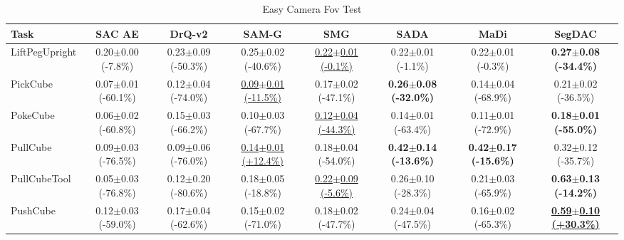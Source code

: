 
\begin{table}[htbp]
\centering
\scriptsize
\caption{Easy Camera Fov Test}
\label{tab:appendix_camerafovtest_easy}
\begin{adjustbox}{max width=\textwidth}
\begin{tabular}{l*{7}{c}}
\toprule
\textbf{Task} & \textbf{SAC AE} & \textbf{DrQ-v2} & \textbf{SAM-G} & \textbf{SMG} & \textbf{SADA} & \textbf{MaDi} & \textbf{SegDAC} \\
\midrule
LiftPegUpright & 0.20$\pm$0.00 \scriptsize{(-7.8\%)} & 0.23$\pm$0.09 \scriptsize{(-50.3\%)} & 0.25$\pm$0.02 \scriptsize{(-40.6\%)} & \underline{0.22$\pm$0.01 \scriptsize{(-0.1\%)}} & 0.22$\pm$0.01 \scriptsize{(-1.1\%)} & 0.22$\pm$0.01 \scriptsize{(-0.3\%)} & \textbf{0.27$\pm$0.08 \scriptsize{(-34.4\%)}} \\
PickCube & 0.07$\pm$0.01 \scriptsize{(-60.1\%)} & 0.12$\pm$0.04 \scriptsize{(-74.0\%)} & \underline{0.09$\pm$0.01 \scriptsize{(-11.5\%)}} & 0.17$\pm$0.02 \scriptsize{(-47.1\%)} & \textbf{0.26$\pm$0.08 \scriptsize{(-32.0\%)}} & 0.14$\pm$0.04 \scriptsize{(-68.9\%)} & 0.21$\pm$0.02 \scriptsize{(-36.5\%)} \\
PokeCube & 0.06$\pm$0.02 \scriptsize{(-60.8\%)} & 0.15$\pm$0.03 \scriptsize{(-66.2\%)} & 0.10$\pm$0.03 \scriptsize{(-67.7\%)} & \underline{0.12$\pm$0.04 \scriptsize{(-44.3\%)}} & 0.14$\pm$0.01 \scriptsize{(-63.4\%)} & 0.11$\pm$0.01 \scriptsize{(-72.9\%)} & \textbf{0.18$\pm$0.01 \scriptsize{(-55.0\%)}} \\
PullCube & 0.09$\pm$0.03 \scriptsize{(-76.5\%)} & 0.09$\pm$0.06 \scriptsize{(-76.0\%)} & \underline{0.14$\pm$0.01 \scriptsize{(+12.4\%)}} & 0.18$\pm$0.04 \scriptsize{(-54.0\%)} & \textbf{0.42$\pm$0.14 \scriptsize{(-13.6\%)}} & \textbf{0.42$\pm$0.17 \scriptsize{(-15.6\%)}} & 0.32$\pm$0.12 \scriptsize{(-35.7\%)} \\
PullCubeTool & 0.05$\pm$0.03 \scriptsize{(-76.8\%)} & 0.12$\pm$0.20 \scriptsize{(-80.6\%)} & 0.18$\pm$0.05 \scriptsize{(-18.8\%)} & \underline{0.22$\pm$0.09 \scriptsize{(-5.6\%)}} & 0.26$\pm$0.10 \scriptsize{(-28.3\%)} & 0.21$\pm$0.03 \scriptsize{(-65.9\%)} & \textbf{0.63$\pm$0.13 \scriptsize{(-14.2\%)}} \\
PushCube & 0.12$\pm$0.03 \scriptsize{(-59.0\%)} & 0.17$\pm$0.04 \scriptsize{(-62.6\%)} & 0.15$\pm$0.02 \scriptsize{(-71.0\%)} & 0.18$\pm$0.02 \scriptsize{(-47.7\%)} & 0.24$\pm$0.04 \scriptsize{(-47.5\%)} & 0.16$\pm$0.02 \scriptsize{(-65.3\%)} & \textbf{\underline{0.59$\pm$0.10 \scriptsize{(+30.3\%)}}} \\

\end{tabular}
\end{adjustbox}
\end{table}
